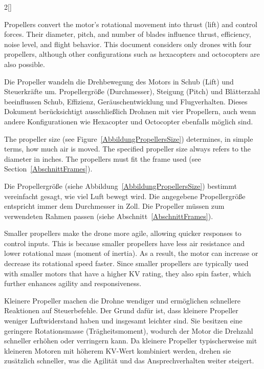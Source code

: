 \begin{paracol}{2}[]
\renewcommand{\deutschertitel}{Propeller}
\renewcommand{\englischertitel}{Propeller}
\makroabschnitt
\label{AbschnittPropeller}

Propellers convert the motor’s rotational movement into thrust (lift) and control forces. Their diameter, pitch, and number of blades influence thrust, efficiency, noise level, and flight behavior. This document considers only drones with four propellers, although other configurations such as hexacopters and octocopters are also possible.

\colger

Die Propeller wandeln die Drehbewegung des Motors in Schub (Lift) und Steuerkräfte um. Propellergröße (Durchmesser), Steigung (Pitch) und Blätterzahl beeinflussen Schub, Effizienz, Geräuschentwicklung und Flugverhalten. Dieses Dokument berücksichtigt ausschließlich Drohnen mit vier Propellern, auch wenn andere Konfigurationen wie Hexacopter und Octocopter ebenfalls möglich sind.

\colende

\renewcommand{\deutschertitel}{Propellergröße (Durchmesser)}
\renewcommand{\englischertitel}{Propeller Size (Diameter)}
\makrounterabschnitt
\label{AbschnittPropellerDurchmesser}

The propeller size (see Figure~\ref{AbbildungPropellersSize}) determines, in simple terms, how much air is moved. The specified propeller size always refers to the diameter in inches. The propellers must fit the frame used (see Section~\ref{AbschnittFrames}).

\colger

Die Propellergröße (siehe Abbildung~\ref{AbbildungPropellersSize}) bestimmt vereinfacht gesagt, wie viel Luft bewegt wird. Die angegebene Propellergröße entspricht immer dem Durchmesser in Zoll. Die Propeller müssen zum verwendeten Rahmen passen (siehe Abschnitt~\ref{AbschnittFrames}).

\coleng

Smaller propellers make the drone more agile, allowing quicker responses to control inputs. This is because smaller propellers have less air resistance and lower rotational mass (moment of inertia). As a result, the motor can increase or decrease its rotational speed faster. Since smaller propellers are typically used with smaller motors that have a higher KV rating, they also spin faster, which further enhances agility and responsiveness.

\colger

Kleinere Propeller machen die Drohne wendiger und ermöglichen schnellere Reaktionen auf Steuerbefehle. Der Grund dafür ist, dass kleinere Propeller weniger Luftwiderstand haben und insgesamt leichter sind. Sie besitzen eine geringere Rotationsmasse (Trägheitsmoment), wodurch der Motor die Drehzahl schneller erhöhen oder verringern kann. Da kleinere Propeller typischerweise mit kleineren Motoren mit höherem KV-Wert kombiniert werden, drehen sie zusätzlich schneller, was die Agilität und das Ansprechverhalten weiter steigert.


\end{paracol}
